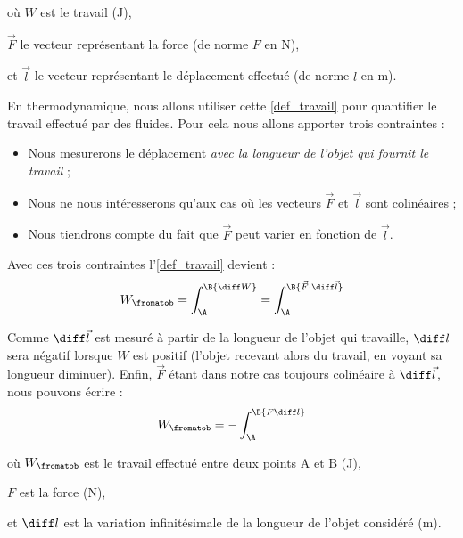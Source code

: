 	\begin{equationterms}		 
		\item où \tab $W$ 		\tab est le travail (\si{\joule}),
		\item 	\tab $\vec F$ 	\tab le vecteur représentant la force (de norme $F$ en \si{\newton}),
		\item et \tab $\vec l$ 	\tab le vecteur représentant le déplacement effectué (de norme $l$ en \si{\metre}).
	\end{equationterms}

	En thermodynamique, nous allons utiliser cette \cref{def_travail} pour quantifier le travail effectué par des fluides. Pour cela nous allons apporter trois contraintes :
	
	\begin{itemize}
		\item Nous mesurerons le déplacement \emph{avec la longueur de l’objet qui fournit le travail} ;
		\item Nous ne nous intéresserons qu’aux cas où les vecteurs $\vec F$ et $\vec l$ sont colinéaires ;
		\item Nous tiendrons compte du fait que $\vec F$ peut varier en fonction de $\vec l$.
	\end{itemize}


	Avec ces trois contraintes l’\cref{def_travail} devient :
		\begin{equation*}
		W_\fromatob = \int_\A^\B {\diff W} = \int_\A^\B {\vec F \cdot \diff \vec l}
		\end{equation*}

	Comme $\diff \vec l$ est mesuré à partir de la longueur de l’objet qui travaille, $\diff l$ sera négatif lorsque $W$ est positif (l’objet recevant alors du travail, en voyant sa longueur diminuer). Enfin, $\vec F$ étant dans notre cas toujours colinéaire à $\diff \vec l$, nous pouvons écrire :
		\begin{equation}
		W_\fromatob = -\int_\A^\B {F \diff l}
		\label{eq_travail_fdl}
		\end{equation}

	\begin{equationterms}		 
		\item où \tab $W_\fromatob$ 	\tab est le travail effectué entre deux points A et B (\si{\joule}),
		\item 	\tab $F$ 				\tab est la force (\si{\newton}),
		\item et \tab $\diff l$ 		\tab est la variation infinitésimale de la longueur de l’objet considéré (\si{\metre}).
	\end{equationterms}

